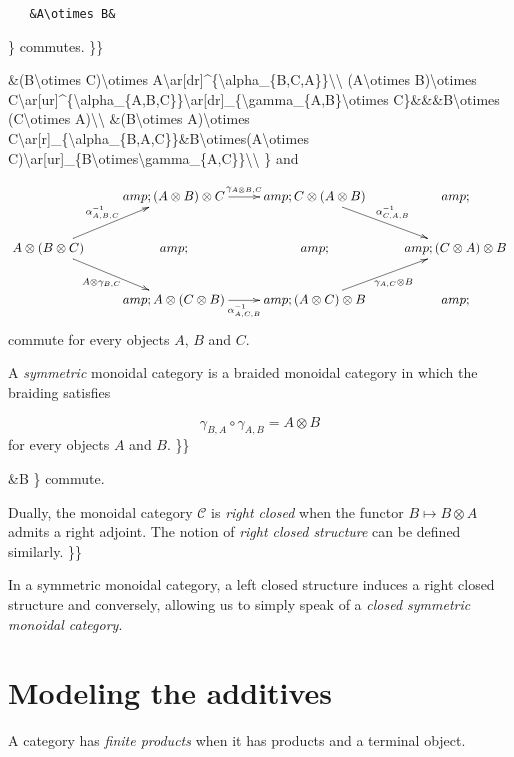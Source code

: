 \texttt{~~~\&A\textbackslash{}otimes~B\&}

\} commutes. \}\}

\&(B\textbackslash{}otimes C)\textbackslash{}otimes
A\textbackslash{}ar{[}dr{]}\^{}\{\textbackslash{}alpha\_\{B,C,A\}\}\textbackslash{}\textbackslash{}
(A\textbackslash{}otimes B)\textbackslash{}otimes
C\textbackslash{}ar{[}ur{]}\^{}\{\textbackslash{}alpha\_\{A,B,C\}\}\textbackslash{}ar{[}dr{]}\_\{\textbackslash{}gamma\_\{A,B\}\textbackslash{}otimes
C\}\&\&\&B\textbackslash{}otimes (C\textbackslash{}otimes
A)\textbackslash{}\textbackslash{} \&(B\textbackslash{}otimes
A)\textbackslash{}otimes
C\textbackslash{}ar{[}r{]}\_\{\textbackslash{}alpha\_\{B,A,C\}\}\&B\textbackslash{}otimes(A\textbackslash{}otimes
C)\textbackslash{}ar{[}ur{]}\_\{B\textbackslash{}otimes\textbackslash{}gamma\_\{A,C\}\}\textbackslash{}\textbackslash{}
\} and

\[\xymatrix{
&amp;(A\otimes B)\otimes C\ar[r]^{\gamma_{A\otimes B,C}}&amp;C\otimes (A\otimes B)\ar[dr]^{\alpha^{-1}_{C,A,B}}&amp;\\
A\otimes (B\otimes C)\ar[ur]^{\alpha^{-1}_{A,B,C}}\ar[dr]_{A\otimes\gamma_{B,C}}&amp;&amp;&amp;(C\otimes A)\otimes B\\
&amp;A\otimes(C\otimes B)\ar[r]_{\alpha^{-1}_{A,C,B}}&amp;(A\otimes C)\otimes B\ar[ur]_{\gamma_{A,C}\otimes B}&amp;\\
}\] commute for every objects \(A\), \(B\) and \(C\).

A \emph{symmetric} monoidal category is a braided monoidal category in
which the braiding satisfies

\[\gamma_{B,A}\circ\gamma_{A,B}=A\otimes B\] for every objects \(A\) and
\(B\). \}\}

\&B \} commute.

Dually, the monoidal category \(\mathcal{C}\) is \emph{right closed}
when the functor \(B\mapsto B\otimes A\) admits a right adjoint. The
notion of \emph{right closed structure} can be defined similarly. \}\}

In a symmetric monoidal category, a left closed structure induces a
right closed structure and conversely, allowing us to simply speak of a
\emph{closed symmetric monoidal category}.

\section{Modeling the additives}\label{modeling-the-additives}

A category has \emph{finite products} when it has products and a
terminal object.

